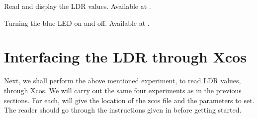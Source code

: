 \begin{scicode}
{Read and display the LDR values.  Available at
  .}
\label{sci:ldr-read}

\end{scicode}

\begin{scicode}
{Turning the blue LED on and off.  Available at
  .}
\label{sci:ldr-led}

\end{scicode}

\section{Interfacing the LDR through Xcos}
Next, we shall perform the above mentioned experiment, to read LDR
values, through Xcos.  We will carry out the same four experiments as in the previous
sections.  For each, will give the location
of the zcos file and the parameters to set.  The reader should go
through the instructions given in  before
getting started.

